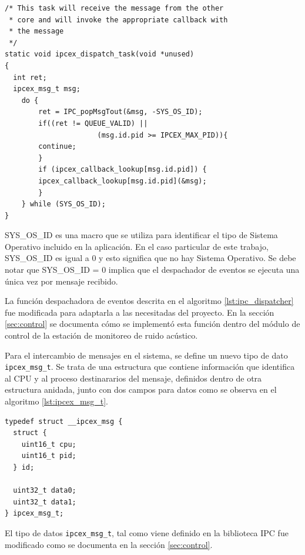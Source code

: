 \begin{lstlisting}[caption={Función despachadora de eventos de la biblioteca IPC.},label={lst:ipc_dispatcher}]
/* This task will receive the message from the other 
 * core and will invoke the appropriate callback with
 * the message
 */
static void ipcex_dispatch_task(void *unused)
{
  int ret;
  ipcex_msg_t msg;
  	do {
    	ret = IPC_popMsgTout(&msg, -SYS_OS_ID);
    	if((ret != QUEUE_VALID) || 
                      (msg.id.pid >= IPCEX_MAX_PID)){
      	continue;
    	}
    	if (ipcex_callback_lookup[msg.id.pid]) {
      	ipcex_callback_lookup[msg.id.pid](&msg);
    	}
  	} while (SYS_OS_ID);
}
\end{lstlisting}
\vspace{5px}
SYS\_OS\_ID es una macro que se utiliza para identificar el tipo de Sistema Operativo incluido en la aplicación.  En el caso particular de este trabajo, SYS\_OS\_ID es igual a 0 y esto significa que no hay Sistema Operativo.  Se debe notar que SYS\_OS\_ID = 0 implica que el despachador de eventos se ejecuta una única vez por mensaje recibido.

La función despachadora de eventos descrita en el algoritmo \ref{lst:ipc_dispatcher} fue modificada para adaptarla a las necesitadas del proyecto.  En la sección \ref{sec:control} se documenta cómo se implementó esta función dentro del módulo de control de la estación de monitoreo de ruido acústico.

Para el intercambio de mensajes en el sistema, se define un nuevo tipo de dato \texttt{ipcex\_msg\_t}.  Se trata de una estructura que contiene información que identifica al CPU y al proceso destinararios del mensaje, definidos dentro de otra estructura anidada, junto con dos campos para datos como se observa en el algoritmo \ref{lst:ipcex_msg_t}. 

\begin{lstlisting}[caption={Definición de un nuevo tipo de dato ipcex\_msg\_t para intercambio de mensajes.},label={lst:ipcex_msg_t}]
typedef struct __ipcex_msg {
  struct {
    uint16_t cpu;
    uint16_t pid;
  } id;

  uint32_t data0;
  uint32_t data1;
} ipcex_msg_t;
\end{lstlisting}

El tipo de datos \texttt{ipcex\_msg\_t}, tal como viene definido en la biblioteca IPC fue modificado como se documenta en la sección \ref{sec:control}.

